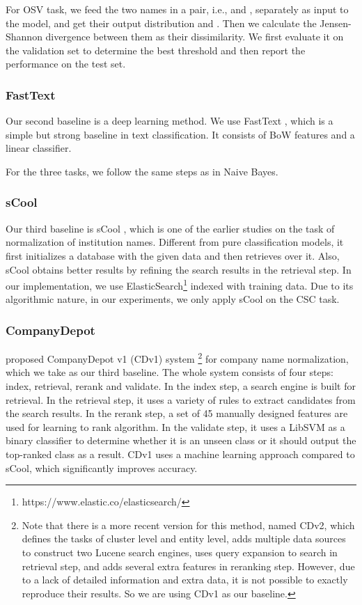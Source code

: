 \documentclass{article}
\begin{document}
For OSV task, we feed the two names in a pair, i.e.,  and , separately as input to the model, and get their output distribution  and .
Then we calculate the Jensen-Shannon divergence between them  as their dissimilarity. 
We first evaluate it on the validation set to determine the best threshold and then report the performance on the test set.

\subsubsection{FastText}
Our second baseline is a deep learning method. We use FastText \cite{joulin2016bag}
, which is a simple but strong baseline in text classification. It consists of BoW features and a linear classifier.

For the three tasks, we follow the same steps as in Naive Bayes.

\subsubsection{sCool}
Our third baseline is sCool \cite{jacob2014scool}, which is one of the earlier studies on the task of normalization of institution names.
Different from pure classification models, it first initializes a database with the given data and then retrieves over it. Also, sCool obtains better results by refining the search results in the retrieval step. In our implementation, we use ElasticSearch\footnote{https://www.elastic.co/elasticsearch/} indexed with training data. Due to its algorithmic nature, in our experiments, we only apply sCool on the CSC task. 


\subsubsection{CompanyDepot} \cite{liu2016companydepot} proposed CompanyDepot v1 (CDv1) system
\footnote{Note that there is a more recent version for this method, named CDv2, which defines the tasks of cluster level and entity level, adds multiple data sources to construct two Lucene search engines, uses query expansion to search in retrieval step, and adds several extra features in reranking step. However, due to a lack of detailed information and extra data, it is not possible to exactly reproduce their results. So we are using CDv1 as our baseline. } 
for company name normalization, which we take as our third baseline. The whole system consists of four steps: index, retrieval, rerank and validate. In the index step, a search engine is built for retrieval. In the retrieval step, it uses a variety of rules to extract candidates from the search results. In the rerank step, a set of 45 manually designed features are used for learning to rank algorithm. In the validate step, it uses a LibSVM as a binary classifier to determine whether it is an unseen class or it should output the top-ranked class as a result. CDv1 uses a machine learning approach compared to sCool, which significantly improves accuracy.
\end{document}
